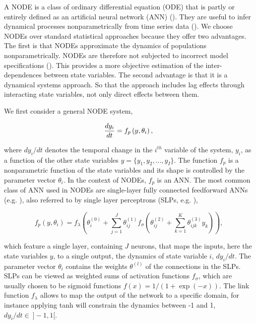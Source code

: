 \documentclass[11pt, oneside]{article}
\begin{document}
A NODE is a class of ordinary differential equation (ODE) that is partly or entirely defined as an artificial neural network (ANN) (\cite{Chen2018}).
They are useful to infer dynamical processes nonparametrically from time series data (\cite{Bonnaffe2021a}).
We choose NODEs over standard statistical approaches because they offer two advantages. 
The first is that NODEs approximate the dynamics of populations nonparametrically.
NODEs are therefore not subjected to incorrect model specifications (\cite{Jost2000,Adamson2013}).
This provides a more objective estimation of the inter-dependences between state variables. 
The second advantage is that it is a dynamical systems approach. 
So that the approach includes lag effects through interacting state variables, not only direct effects between them. 

We first consider a general NODE system,

\vspace{-0.5cm}
\begin{equation}
    \frac{dy_i}{dt} = f_p \left(y,\theta_i \right), \\
\end{equation}

where $dy_i/dt$ denotes the temporal change in the $i^{th}$ variable of the system, $y_i$, as a function of the other state variables $y = \{ y_1, y_2, ..., y_I\}$.
The function $f_p$ is a nonparametric function of the state variables and its shape is controlled by the parameter vector $\theta_i$.
In the context of NODEs, $f_p$ is an ANN.
The most common class of ANN used in NODEs are single-layer fully connected feedforward ANNs (e.g. \cite{Wu2005}), also referred to by single layer perceptrons (SLPs, e.g. \cite{Bonnaffe2021a}),

\vspace{-0.5cm}
\begin{equation}
    f_p \left(y, \theta_i \right) = f_\lambda \left( \theta_i^{(0)} + \sum_{j=1}^{J} \theta^{(1)}_{ij} f_\sigma \left( \theta^{(2)}_{ij} + \sum_{k=1}^{K} \theta^{(3)}_{ijk} y_k \right) \right),
\end{equation}

which feature a single layer, containing $J$ neurons, that maps the inputs, here the state variables $y$, to a single output, the dynamics of state variable $i$, $dy_i/dt$.
The parameter vector $\theta_i$ contains the weights $\theta^{(l)}$ of the connections in the SLPs.
SLPs can be viewed as weighted sums of activation functions $f_\sigma$, which are usually chosen to be sigmoid functions $f(x) = 1/(1+\exp(-x))$.
The link function $f_\lambda$ allows to map the output of the network to a specific domain, for instance applying tanh will constrain the dynamics between -1 and 1, $dy_i/dt \in~]-1,1[$. 
\end{document}
